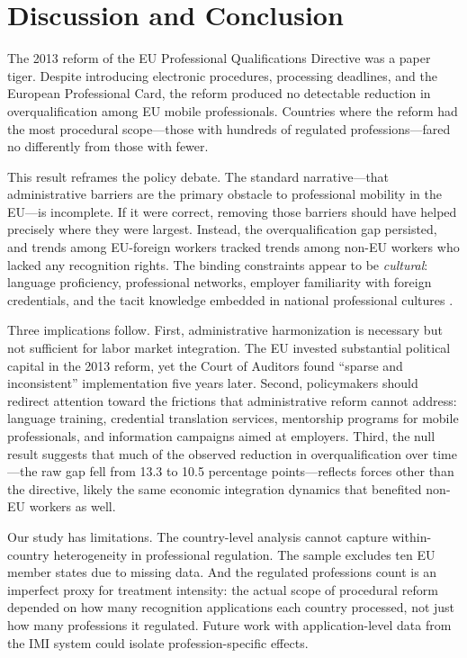 \documentclass[12pt]{article}
\begin{document}
\section{Discussion and Conclusion}\label{sec:conclusion}

The 2013 reform of the EU Professional Qualifications Directive was a paper tiger. Despite introducing electronic procedures, processing deadlines, and the European Professional Card, the reform produced no detectable reduction in overqualification among EU mobile professionals. Countries where the reform had the most procedural scope---those with hundreds of regulated professions---fared no differently from those with fewer.

This result reframes the policy debate. The standard narrative---that administrative barriers are the primary obstacle to professional mobility in the EU---is incomplete. If it were correct, removing those barriers should have helped precisely where they were largest. Instead, the overqualification gap persisted, and trends among EU-foreign workers tracked trends among non-EU workers who lacked any recognition rights. The binding constraints appear to be \emph{cultural}: language proficiency, professional networks, employer familiarity with foreign credentials, and the tacit knowledge embedded in national professional cultures \citep{guild2014, geis2019}.

Three implications follow. First, administrative harmonization is necessary but not sufficient for labor market integration. The EU invested substantial political capital in the 2013 reform, yet the Court of Auditors found ``sparse and inconsistent'' implementation five years later. Second, policymakers should redirect attention toward the frictions that administrative reform cannot address: language training, credential translation services, mentorship programs for mobile professionals, and information campaigns aimed at employers. Third, the null result suggests that much of the observed reduction in overqualification over time---the raw gap fell from 13.3 to 10.5 percentage points---reflects forces other than the directive, likely the same economic integration dynamics that benefited non-EU workers as well.

Our study has limitations. The country-level analysis cannot capture within-country heterogeneity in professional regulation. The sample excludes ten EU member states due to missing data. And the regulated professions count is an imperfect proxy for treatment intensity: the actual scope of procedural reform depended on how many recognition applications each country processed, not just how many professions it regulated. Future work with application-level data from the IMI system could isolate profession-specific effects.
\end{document}
